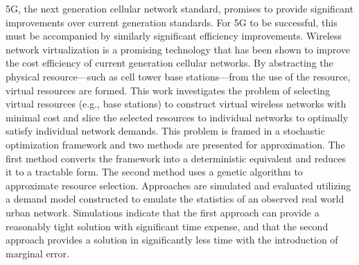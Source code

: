 \documentclass[12pt,dvipsnames]{report}
\begin{document}

5G, the next generation cellular network standard, promises to provide significant improvements over current generation standards.  For 5G to be successful, this must be accompanied by similarly significant efficiency improvements.  Wireless network virtualization is a promising technology that has been shown to improve the cost efficiency of current generation cellular networks.  By abstracting the physical resource---such as cell tower base stations---from the use of the resource, virtual resources are formed.  This work investigates the problem of selecting virtual resources (e.g., base stations) to construct virtual wireless networks with minimal cost and slice the selected resources to individual networks to optimally satisfy individual network demands.  This problem is framed in a stochastic optimization framework and two methods are presented for approximation.  The first method converts the framework into a deterministic equivalent and reduces it to a tractable form.  The second method uses a genetic algorithm to approximate resource selection.  Approaches are simulated and evaluated utilizing a demand model constructed to emulate the statistics of an observed real world urban network.  Simulations indicate that the first approach can provide a reasonably tight solution with significant time expense, and that the second approach provides a solution in significantly less time with the introduction of marginal error.
\end{document}
